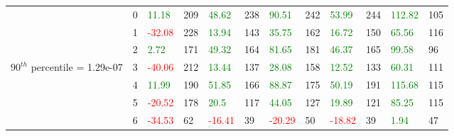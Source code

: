\begin{table}[htb!]
\begin{adjustwidth}{-0.9in}{-0.9in}
\begin{tabular}{|p{5em}|p{2em}|p{3em}|p{3em}|p{3em}|p{3em}|p{3em}|p{3em}|p{3em}|p{3em}|p{3em}|p{3em}|}
            & 0 & \textcolor{green}{11.18} & 209 & \textcolor{green}{48.62} & 238 & \textcolor{green}{90.51} & 242 & \textcolor{green}{53.99} & 244 & \textcolor{green}{112.82} & 105\\\cline{3-12}
            & 1 & \textcolor{red}{-32.08} & 228 & \textcolor{green}{13.94} & 143 & \textcolor{green}{35.75} & 162 & \textcolor{green}{16.72} & 150 & \textcolor{green}{65.56} & 116\\\cline{3-12}
            & 2 & \textcolor{green}{2.72} & 171 & \textcolor{green}{49.32} & 164 & \textcolor{green}{81.65} & 181 & \textcolor{green}{46.37} & 165 & \textcolor{green}{99.58} & 96\\\cline{3-12}
            $90^{th}$ percentile = 1.29e-07 & 3 & \textcolor{red}{-40.06} & 212 & \textcolor{green}{13.44} & 137 & \textcolor{green}{28.08} & 158 & \textcolor{green}{12.52} & 133 & \textcolor{green}{60.31} & 111\\[-5.5ex]\cline{3-12}
            & 4 & \textcolor{green}{11.99} & 190 & \textcolor{green}{51.85} & 166 & \textcolor{green}{88.87} & 175 & \textcolor{green}{50.19} & 191 & \textcolor{green}{115.68} & 115\\\cline{3-12}
            & 5 & \textcolor{red}{-20.52} & 178 & \textcolor{green}{20.5} & 117 & \textcolor{green}{44.05} & 127 & \textcolor{green}{19.89} & 121 & \textcolor{green}{85.25} & 115\\\cline{3-12}
            & 6 & \textcolor{red}{-34.53} & 62 & \textcolor{red}{-16.41} & 39 & \textcolor{red}{-20.29} & 50 & \textcolor{red}{-18.82} & 39 & \textcolor{green}{1.94} & 47\\\hline\hline


\end{tabular}
\end{adjustwidth}
\end{table}
